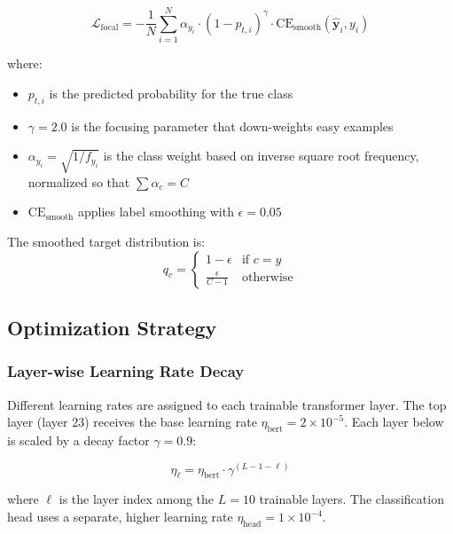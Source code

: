 \documentclass[conference, 10pt]{IEEEtran}
\begin{document}
\begin{equation}
    \mathcal{L}_{\text{focal}} = -\frac{1}{N} \sum_{i=1}^{N} \alpha_{y_i} \cdot (1 - p_{t,i})^{\gamma} \cdot \text{CE}_{\text{smooth}}(\hat{\mathbf{y}}_i, y_i)
    \label{eq:focal}
\end{equation}

where:
\begin{itemize}[noitemsep]
    \item $p_{t,i}$ is the predicted probability for the true class
    \item $\gamma = 2.0$ is the focusing parameter that down-weights easy examples
    \item $\alpha_{y_i} = \sqrt{1/f_{y_i}}$ is the class weight based on inverse square root frequency, normalized so that $\sum \alpha_c = C$
    \item $\text{CE}_{\text{smooth}}$ applies label smoothing with $\epsilon = 0.05$
\end{itemize}

The smoothed target distribution is:
\begin{equation}
    q_c = \begin{cases}
        1 - \epsilon & \text{if } c = y \\
        \frac{\epsilon}{C - 1} & \text{otherwise}
    \end{cases}
\end{equation}

\subsection{Optimization Strategy}

\subsubsection{Layer-wise Learning Rate Decay}
Different learning rates are assigned to each trainable transformer layer. The top layer (layer 23) receives the base learning rate $\eta_{\text{bert}} = 2 \times 10^{-5}$. Each layer below is scaled by a decay factor $\gamma = 0.9$:

\begin{equation}
    \eta_{\ell} = \eta_{\text{bert}} \cdot \gamma^{(L - 1 - \ell)}
    \label{eq:lrdecay}
\end{equation}

where $\ell$ is the layer index among the $L = 10$ trainable layers. The classification head uses a separate, higher learning rate $\eta_{\text{head}} = 1 \times 10^{-4}$.
\end{document}
